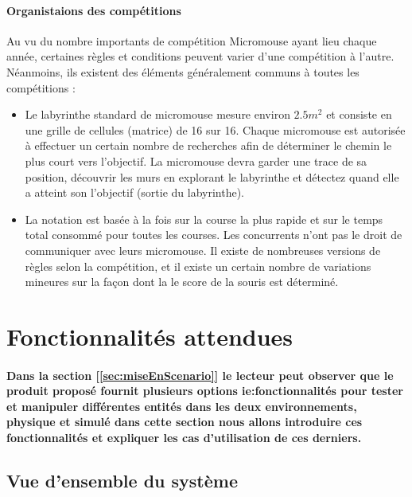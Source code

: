 \paragraph{Organistaions des compétitions}
   Au vu du nombre importants de compétition Micromouse ayant lieu chaque année,
certaines règles et conditions peuvent varier d'une compétition à l'autre.
Néanmoins, ils existent des éléments généralement communs à toutes les
compétitions : 
\\ 

\begin{itemize}

\item
   Le labyrinthe standard de micromouse mesure environ $2.5m^2$
et consiste en une grille de cellules (matrice) de 16 sur 16. Chaque micromouse
est autorisée à effectuer un certain nombre de recherches afin de déterminer le
chemin le plus court vers l'objectif.  La micromouse devra garder une trace de
sa position, découvrir les murs en explorant le labyrinthe et détectez quand
elle a atteint son l'objectif (sortie du labyrinthe). \\

\item
   La notation est basée à la fois sur la course la plus rapide et sur le temps
total consommé pour toutes les courses. Les concurrents n'ont pas le droit de
communiquer avec leurs micromouse.  Il existe de nombreuses versions de règles
selon la compétition, et il existe un certain nombre de variations mineures sur
la façon dont la le score de la souris est déterminé. \\

\end{itemize}


\clearpage
\section{Fonctionnalités attendues} \label{sec:foncAttendues}
\paragraph{
   Dans la section [\ref{sec:miseEnScenario}] le lecteur peut observer que le
produit proposé fournit plusieurs options ie:fonctionnalités pour tester et
manipuler différentes entités dans les deux environnements, physique et
simulé dans cette section nous allons introduire ces fonctionnalités et
expliquer les cas d'utilisation de ces derniers.}

\subsection{Vue d’ensemble du système} \label{subsec:vueEns}

